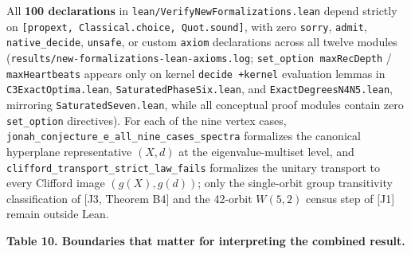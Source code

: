 \documentclass[11pt,a4paper]{article}
\begin{document}
All \textbf{100 declarations} in \nolinkurl{lean/VerifyNewFormalizations.lean} depend strictly on
\texttt{{[}propext,\ Classical.choice,\ Quot.sound{]}}, with zero \texttt{sorry}, \texttt{admit}, \texttt{native\_decide}, \texttt{unsafe}, or
custom \texttt{axiom} declarations across all twelve modules (\nolinkurl{results/new-formalizations-lean-axioms.log};
\texttt{set\_option\ maxRecDepth} / \texttt{maxHeartbeats} appears only on kernel \texttt{decide\ +kernel} evaluation lemmas in
\nolinkurl{C3ExactOptima.lean}, \nolinkurl{SaturatedPhaseSix.lean}, and \nolinkurl{ExactDegreesN4N5.lean}, mirroring \nolinkurl{SaturatedSeven.lean},
while all conceptual proof modules contain zero \texttt{set\_option} directives). For each of the nine vertex cases,
\nolinkurl{jonah_conjecture_e_all_nine_cases_spectra} formalizes the canonical hyperplane representative \((X,d)\) at
the eigenvalue-multiset level, and \nolinkurl{clifford_transport_strict_law_fails} formalizes the unitary transport
to every Clifford image \((g(X), g(d))\); only the single-orbit group transitivity classification of
{[}J3, Theorem B4{]} and the 42-orbit \(W(5,2)\) census step of {[}J1{]} remain outside Lean.

\textbf{Table 10. Boundaries that matter for interpreting the combined result.}
\end{document}
